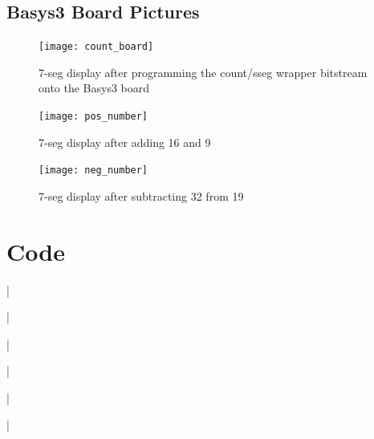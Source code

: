 \documentclass[11pt]{article}
\newcommand{\Verilog}[2][]{%
	
}
\begin{document}
\subsection*{Basys3 Board Pictures}
\begin{figure}[ht]\centering
\texttt{[image: count\_board]}
	\caption{7-seg display after programming the count/sseg wrapper bitstream onto the Basys3 board}
	\label{fig:sim_with_table}
\end{figure}

\begin{figure}[ht]\centering
\texttt{[image: pos\_number]}
	\caption{7-seg display after adding 16 and 9}
	\label{fig:sim_with_table}
\end{figure}


\begin{figure}[ht]\centering
\texttt{[image: neg\_number]}
	\caption{7-seg display after subtracting 32 from 19}
	\label{fig:sim_with_table}
\end{figure}




\section*{Code}

\Verilog[firstline=22, lastline=41, caption=Counter Module Code]{Lab10_project/codedirectory/counter.sv}|

\Verilog[firstline=22, lastline=39, caption=Counter Test Module Code]{Lab10_project/codedirectory/counter_test.sv}|

\Verilog[firstline=22, lastline=48, caption=Counter 7-seg Module Code]{Lab10_project/codedirectory/count_sseg_wrapper.sv}|

\Verilog[firstline=22, lastline=51, caption=Show 2's Comp Module Code]{Lab10_project/codedirectory/show2c.sv}|

\Verilog[firstline=22, lastline=42, caption=Show 2's Comp Test Module Code]{Lab10_project/codedirectory/show2c_test.sv}|

\Verilog[firstline=22, lastline=67, caption=Top-Level Module Code]{Lab10_project/codedirectory/top_level.sv}|
\end{document}
